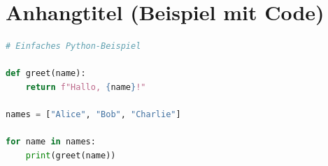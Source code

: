 \documentclass[12pt,a4paper,numbers=noenddot]{scrreprt}
\begin{document}
\hypersetup{pageanchor=false}

\hypersetup{pageanchor=true}




\tableofcontents       %
\cleardoublepage


\cleardoublepage

\listoffigures         %
\cleardoublepage

\listoftables          %
\cleardoublepage

\setcounter{page}{1}




\appendix
\chapter{Anhangtitel (Beispiel mit Code)}
\label{anh:beispiel}

\begin{lstlisting}[language=Python]
# Einfaches Python-Beispiel

def greet(name):
    return f"Hallo, {name}!"

names = ["Alice", "Bob", "Charlie"]

for name in names:
    print(greet(name))
\end{lstlisting}

\printbibliography[heading=bibintoc]

% 

% 
\end{document}
